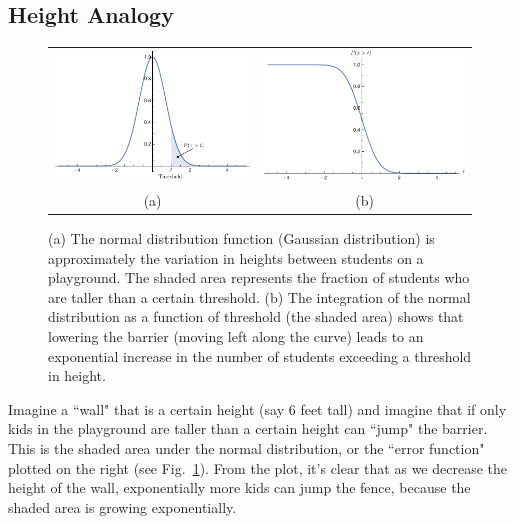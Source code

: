 \subsection{Height Analogy}
\begin{figure}[tb]
\begin{center}
\begin{tabular}{cc}
\includegraphics[width=.5\columnwidth]{norm4} &
\includegraphics[width=.5\columnwidth]{erf} \\
(a) & (b) \\
\end{tabular}
\end{center}
\caption{(a) The normal distribution function (Gaussian distribution) is approximately the variation in heights between students on a playground.  The shaded area represents the fraction of students who are taller than a certain threshold.  (b)  The integration of the normal distribution as a function of threshold (the shaded area) shows that lowering the barrier (moving left along the curve) leads to an exponential increase in the number of students exceeding a threshold in height.}
\label{fig:norm4}
\end{figure}

Imagine a ``wall" that is a certain height (say 6 feet tall) and imagine that if only kids in the playground are taller than a certain height can ``jump" the barrier.  This is the shaded area under the normal distribution, or the ``error function" plotted on the right (see Fig.~\ref{fig:norm4}).   From the plot, it's clear that as we decrease the height of the wall, exponentially more kids can jump the fence, because the shaded area is growing exponentially.  
